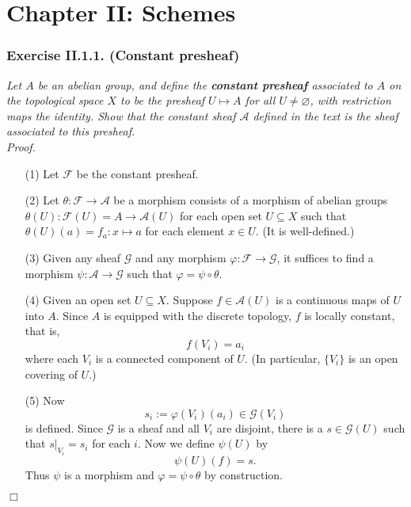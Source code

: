 \documentclass{article}
\begin{document}



\newpage
\section*{Chapter II: Schemes \\}



\subsubsection*{Exercise II.1.1. (Constant presheaf)}
\emph{Let $A$ be an abelian group, and define the \textbf{constant presheaf}
associated to $A$ on the topological space $X$ to be
the presheaf $U \mapsto A$ for all $U \neq \varnothing$,
with restriction maps the identity.
Show that the constant sheaf $\mathscr{A}$ defined in the text is
the sheaf associated to this presheaf.} \\



\emph{Proof.}
\begin{enumerate}
\item[(1)]
  Let $\mathscr{F}$ be the constant presheaf.

\item[(2)]
  Let $\theta: \mathscr{F} \to \mathscr{A}$ be a morphism
  consists of a morphism of abelian groups $\theta(U): \mathscr{F}(U) = A \to \mathscr{A}(U)$
  for each open set $U \subseteq X$
  such that $\theta(U)(a) = f_a: x \mapsto a$ for each element $x \in U$. (It is well-defined.)

\item[(3)]
  Given any sheaf $\mathscr{G}$ and any morphism $\varphi: \mathscr{F} \to \mathscr{G}$,
  it suffices to find a morphism $\psi: \mathscr{A} \to \mathscr{G}$
  such that $\varphi = \psi \circ \theta$.

\item[(4)]
  Given an open set $U \subseteq X$.
  Suppose $f \in \mathscr{A}(U)$ is a continuous maps of $U$ into $A$.
  Since $A$ is equipped with the discrete topology, $f$ is locally constant, that is,
  \[
    f(V_i) = a_i
  \]
  where each $V_i$ is a connected component of $U$.
  (In particular, $\{V_i\}$ is an open covering of $U$.)

\item[(5)]
  Now
  \[
    s_i := \varphi(V_i)(a_i) \in \mathscr{G}(V_i)
  \]
  is defined.
  Since $\mathscr{G}$ is a sheaf and all $V_i$ are disjoint,
  there is a $s \in \mathscr{G}(U)$ such that $s|_{V_i} = s_i$ for each $i$.
  Now we define $\psi(U)$ by
  \[
    \psi(U)(f) = s.
  \]
  Thus $\psi$ is a morphism and $\varphi = \psi \circ \theta$ by construction.
\end{enumerate}
$\Box$ \\\\
\end{document}
